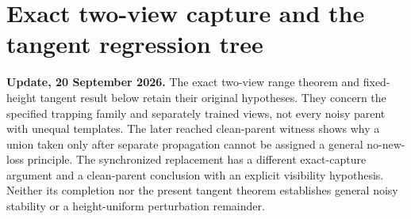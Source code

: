 \documentclass[11pt,oneside,openany,a4paper]{book}
\numberwithin{equation}{chapter}
\theoremstyle{definition}
\theoremstyle{remark}
\newcommand{\R}{\mathbb R}\newcommand{\E}{\mathbb E}\newcommand{\Prb}{\mathbb P}\newcommand{\PP}{\mathbb P}
\newcommand{\F}[1]{\left\lVert#1\right\rVert_F}
\newcommand{\op}[1]{\left\lVert#1\right\rVert_{\rm op}}
\DeclareMathOperator{\tr}{tr}\DeclareMathOperator{\rank}{rank}
\DeclareMathOperator{\diag}{blockdiag}\DeclareMathOperator{\range}{range}
\DeclareMathOperator{\ran}{range}\DeclareMathOperator{\OPT}{OPT}
\newcommand{\HH}{\mathcal H}\newcommand{\SSS}{\mathcal S}
\begin{document}
\begingroup
\let\E\relax
\newcommand{\E}{\mathbb E}
\let\PP\relax
\newcommand{\PP}{\mathbb P}
\let\R\relax
\newcommand{\R}{\mathbb R}
\let\F\relax
\newcommand{\F}[1]{\lVert #1\rVert_F}
\let\op\relax
\newcommand{\op}[1]{\lVert #1\rVert_{\mathrm{op}}}
\let\ran\relax
\newcommand{\ran}{\operatorname{range}}
\let\rank\relax
\newcommand{\rank}{\operatorname{rank}}
\let\diag\relax
\newcommand{\diag}{\operatorname{blockdiag}}
\let\dist\relax
\newcommand{\dist}{\operatorname{dist}}
\let\OPT\relax
\newcommand{\OPT}{\operatorname{OPT}}
\let\HH\relax
\newcommand{\HH}{\mathcal H}
\let\SSS\relax
\newcommand{\SSS}{\mathcal S}
\let\Id\relax
\newcommand{\Id}{\mathrm I}
\let\tr\relax
\newcommand{\tr}{\operatorname{tr}}
\chapter{Exact two-view capture and the tangent regression tree}\label{ch:tangent}
\begin{scopebox}
\textbf{Update, 20 September 2026.} The exact two-view range theorem and fixed-height tangent result below retain their original hypotheses. They concern the specified trapping family and separately trained views, not every noisy parent with unequal templates. The later reached clean-parent witness shows why a union taken only after separate propagation cannot be assigned a general no-new-loss principle. The synchronized replacement has a different exact-capture argument and a clean-parent conclusion with an explicit visibility hypothesis. Neither its completion nor the present tangent theorem establishes general noisy stability or a height-uniform perturbation remainder.
\end{scopebox}
\end{document}
